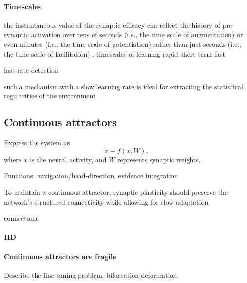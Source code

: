 \documentclass{article}
\theoremstyle{definition} \newtheorem{definition}{Definition}
\theoremstyle{remark} \newtheorem{remark}{Remark}
\newcounter{ct}
\begin{document}
\paragraph{Timescales}
the instantaneous value of the synaptic efficacy can reflect the history of pre-synaptic activation over tens of seconds (i.e., the time scale of augmentation) or even minutes (i.e., the time scale of potentiation) rather than just seconds (i.e., the time scale of facilitation)  \citep{thomson2000facilitation}.
timescales of learning\citep{miller2024timescales}
rapid \citep{li2023rapid} \citep{dan2024neural} 
short term \citep{fioravante2011short}
fast \citep{fiebig2020indexing}
\citep{brennan2023attractor}

fast rate detection\citep{zenke2013synaptic}

such a mechanism with a slow learning rate is ideal for extracting the statistical regularities of the environment \citep{panichello2019error}








\subsection{Continuous attractors}
Express the system as 
\begin{equation}
\dot x = f(x,W),
\end{equation} where $x$ is the neural activity, and $W$ represents synaptic weights.

Functions: navigation/head-direction\citep{wilson2023navigation, skaggs1994model}, evidence integration\citep{mante2013context, esnaola2022flexible}

To maintain a continuous attractor, synaptic plasticity should preserve the network’s structured connectivity while allowing for slow adaptation.
\citep{cannon1983oculomotor}
\citep{samsonovich1997pathintegration}

connectome \citep{kakaria2017ra}

\paragraph{HD}
\citep{skaggs1994model, redish1996coupled, boucheny2005continuous}
\citep{stentiford2022spiking}
\citep{barak2021mapping}

\paragraph{Continuous attractors are fragile}
Describe the fine-tuning problem.
bifurcation \citep{dercole2011dynamical}
deformation \citep{goodridge2000modeling}
\end{document}
